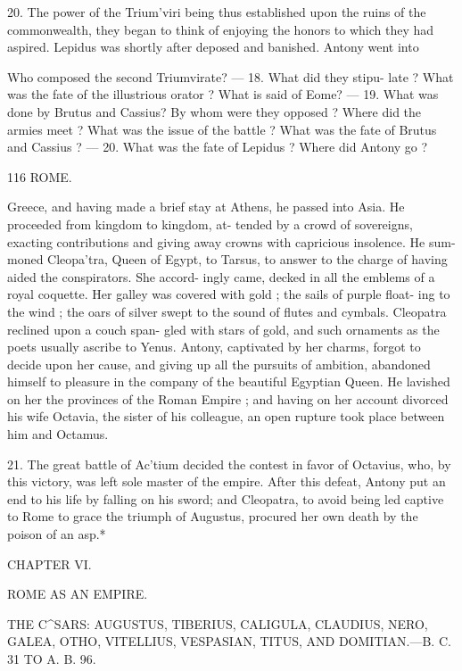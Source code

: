 \documentclass[openany,a4paper]{memoir}
\begin{document}
20. The power of the Trium'viri being thus established 
upon the ruins of the commonwealth, they began to think 
of enjoying the honors to which they had aspired. Lepidus 
was shortly after deposed and banished. Antony went into 

Who composed the second Triumvirate? — 18. What did they stipu- 
late ? What was the fate of the illustrious orator ? What is said of 
Eome? — 19. What was done by Brutus and Cassius? By whom were 
they opposed ? Where did the armies meet ? What was the issue of 
the battle ? What was the fate of Brutus and Cassius ? — 20. What was 
the fate of Lepidus ? Where did Antony go ? 



116 ROME. 

Greece, and having made a brief stay at Athens, he passed 
into Asia. He proceeded from kingdom to kingdom, at- 
tended by a crowd of sovereigns, exacting contributions and 
giving away crowns with capricious insolence. He sum- 
moned Cleopa'tra, Queen of Egypt, to Tarsus, to answer 
to the charge of having aided the conspirators. She accord- 
ingly came, decked in all the emblems of a royal coquette. 
Her galley was covered with gold ; the sails of purple float- 
ing to the wind ; the oars of silver swept to the sound of 
flutes and cymbals. Cleopatra reclined upon a couch span- 
gled with stars of gold, and such ornaments as the poets 
usually ascribe to Yenus. Antony, captivated by her charms, 
forgot to decide upon her cause, and giving up all the pursuits 
of ambition, abandoned himself to pleasure in the company 
of the beautiful Egyptian Queen. He lavished on her the 
provinces of the Roman Empire ; and having on her account 
divorced his wife Octavia, the sister of his colleague, an open 
rupture took place between him and Octamus. 

21. The great battle of Ac'tium decided the contest in 
favor of Octavius, who, by this victory, was left sole master 
of the empire. After this defeat, Antony put an end to 
his life by falling on his sword; and Cleopatra, to avoid 
being led captive to Rome to grace the triumph of Augustus, 
procured her own death by the poison of an asp.* 



CHAPTER VI. 

ROME AS AN EMPIRE. 

THE C^SARS: AUGUSTUS, TIBERIUS, CALIGULA, CLAUDIUS, 
NERO, GALEA, OTHO, VITELLIUS, VESPASIAN, TITUS, AND 
DOMITIAN.—B. C. 31 TO A. B. 96. 
\end{document}
